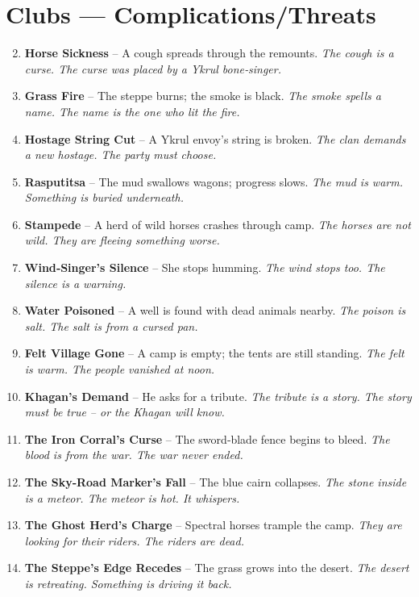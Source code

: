 \documentclass[11pt]{book}
\begin{document}
\section*{Clubs — Complications/Threats}
\begin{enumerate}
\setcounter{enumi}{1}
\item \textbf{Horse Sickness} – A cough spreads through the remounts. \textit{The cough is a curse. The curse was placed by a Ykrul bone‑singer.}
\item \textbf{Grass Fire} – The steppe burns; the smoke is black. \textit{The smoke spells a name. The name is the one who lit the fire.}
\item \textbf{Hostage String Cut} – A Ykrul envoy’s string is broken. \textit{The clan demands a new hostage. The party must choose.}
\item \textbf{Rasputitsa} – The mud swallows wagons; progress slows. \textit{The mud is warm. Something is buried underneath.}
\item \textbf{Stampede} – A herd of wild horses crashes through camp. \textit{The horses are not wild. They are fleeing something worse.}
\item \textbf{Wind‑Singer’s Silence} – She stops humming. \textit{The wind stops too. The silence is a warning.}
\item \textbf{Water Poisoned} – A well is found with dead animals nearby. \textit{The poison is salt. The salt is from a cursed pan.}
\item \textbf{Felt Village Gone} – A camp is empty; the tents are still standing. \textit{The felt is warm. The people vanished at noon.}
\item \textbf{Khagan’s Demand} – He asks for a tribute. \textit{The tribute is a story. The story must be true – or the Khagan will know.}
\item[J] \textbf{The Iron Corral’s Curse} – The sword‑blade fence begins to bleed. \textit{The blood is from the war. The war never ended.}
\item[Q] \textbf{The Sky‑Road Marker’s Fall} – The blue cairn collapses. \textit{The stone inside is a meteor. The meteor is hot. It whispers.}
\item[K] \textbf{The Ghost Herd’s Charge} – Spectral horses trample the camp. \textit{They are looking for their riders. The riders are dead.}
\item[A] \textbf{The Steppe’s Edge Recedes} – The grass grows into the desert. \textit{The desert is retreating. Something is driving it back.}
\end{enumerate}
\end{document}
